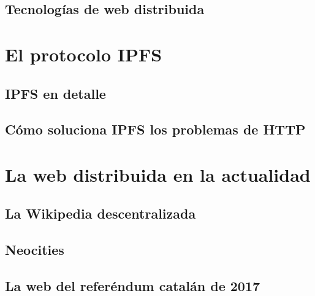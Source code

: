 \documentclass[12pt]{article} %
\begin{document}
\subsection{Tecnologías de web distribuida} %
\label{sub:tecnologías_de_web_distribuida}



\section{El protocolo IPFS} %
\label{sec:el_protocolo_ipfs}

\subsection{IPFS en detalle} %
\label{sub:ipfs_en_detalle}


\subsection{Cómo soluciona IPFS los problemas de HTTP} %
\label{sub:cómo_soluciona_ipfs_los_problemas_de_http}



\section{La web distribuida en la actualidad} %
\label{sec:la_web_distribuida_en_la_actualidad}

\subsection{La Wikipedia descentralizada} %
\label{sub:la_wikipedia_descentralizada}


\subsection{Neocities} %
\label{sub:neocities}


\subsection{La web del referéndum catalán de 2017} %
\label{sub:la_web_del_referéndum_catalán_de_2017}
\end{document}
